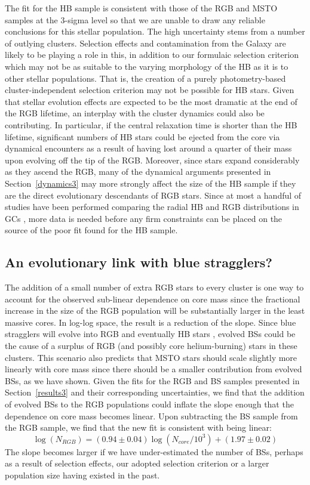 The fit for the HB sample is consistent with those of the RGB and MSTO
samples at the 3-sigma level so that we are unable to draw any
reliable conclusions for this stellar population.  The high
uncertainty stems from a number of outlying clusters.  
Selection effects and contamination from the Galaxy are likely to be
playing a role in this, in addition to our formulaic selection
criterion which may not be as suitable to the varying morphology of
the HB as it is to other stellar populations.  That is, the creation of
a purely photometry-based cluster-independent selection criterion may
not be possible for HB stars.  Given that stellar evolution effects
are expected to be the 
most dramatic at the end of the RGB lifetime, an interplay with the
cluster dynamics could also be contributing.  In particular, if the
central relaxation time is shorter than the HB lifetime, 
significant numbers of HB stars could be ejected from the core via
dynamical encounters as a result of having lost around a quarter of
their mass upon evolving off the tip of the RGB.  Moreover, since
stars expand considerably as they ascend the RGB, many of
the dynamical arguments presented in Section~\ref{dynamics3} may more
strongly affect the size of the HB sample if they are the direct
evolutionary descendants of RGB stars.  Since at most a handful of
studies have been performed comparing the radial HB and RGB
distributions in GCs \citep[e.g.][]{iannicola09}, more data is needed
before any firm constraints can be placed on the source of the 
poor fit found for the HB sample.

\subsection{An evolutionary link with blue stragglers?}

The addition of a small number of extra RGB stars to every cluster is one
way to account for the observed sub-linear dependence on core
mass since the fractional increase in the size of
the RGB population will be substantially larger in the least massive
cores.  In log-log space, the result is a reduction of the
slope.  Since blue stragglers will evolve
into RGB and eventually HB stars \citep{sills09}, evolved BSs could be
the cause of a surplus of RGB (and possibly  
core helium-burning) stars in these clusters.  This scenario also
predicts that MSTO stars should scale slightly more linearly with core
mass since there should be a smaller contribution from evolved BSs, as
we have shown.  Given the fits for the RGB and BS  
samples presented in Section~\ref{results3} and their corresponding
uncertainties, we find that the addition of evolved BSs to the RGB
populations could inflate the slope enough that the dependence on core
mass becomes linear.  Upon subtracting the BS sample from the RGB
sample, we find that the new fit is consistent with being linear:
\begin{equation}
\log (N_{RGB}) = (0.94 \pm 0.04)\log (N_{core}/10^3) + (1.97 \pm 0.02)
\end{equation}
The slope becomes larger if we have under-estimated the
number of BSs, perhaps as a result of selection effects, our adopted
selection criterion or a larger population size having existed in the
past.

